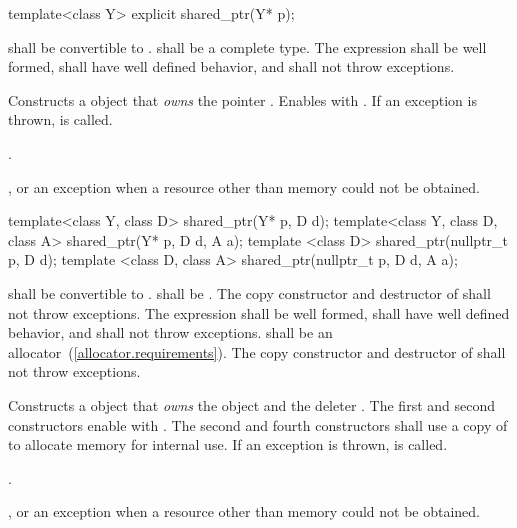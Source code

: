%
\begin{itemdecl}
template<class Y> explicit shared_ptr(Y* p);
\end{itemdecl}

\begin{itemdescr}
\pnum\requires  {} shall be convertible to .
 shall be a complete type. The expression 
shall be well formed, shall have well defined behavior, and shall not
throw exceptions.

\pnum\effects Constructs a  object
that \textit{owns} the pointer .
Enables  with .
If an exception is thrown,  is called.

\pnum\postconditions  {}.

\pnum\throws {}, or an  exception when a resource other than memory could not be obtained.
\end{itemdescr}

%
\begin{itemdecl}
template<class Y, class D> shared_ptr(Y* p, D d);
template<class Y, class D, class A> shared_ptr(Y* p, D d, A a);
template <class D> shared_ptr(nullptr_t p, D d);
template <class D, class A> shared_ptr(nullptr_t p, D d, A a);
\end{itemdecl}

\begin{itemdescr}
\pnum\requires  {} shall be convertible to .  shall be
. The copy constructor and destructor of 
shall not throw exceptions. The expression  shall be
well formed, shall have well defined behavior, and shall not throw exceptions.
 shall be an allocator~(\ref{allocator.requirements}).
The copy constructor and destructor of  shall not throw exceptions.

\pnum\effects  Constructs a  object that \textit{owns} the
object  and the deleter .
The first and second constructors enable  with .
The second and fourth constructors shall use a copy of  to
allocate memory for internal use.
If an exception is thrown,  is called.

\pnum\postconditions  {}.

\pnum\throws  {}, or an  exception
when a resource other than memory could not be obtained.
\end{itemdescr}


